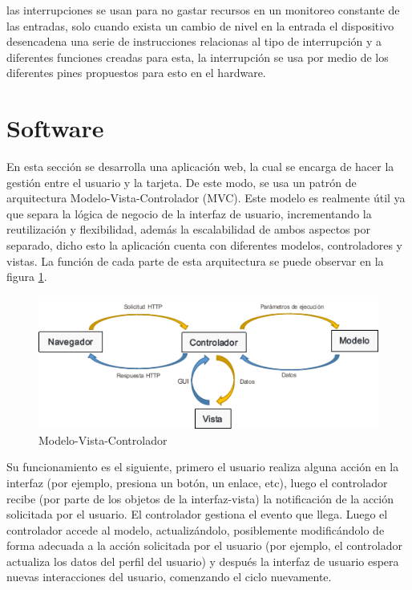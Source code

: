 las interrupciones se usan para no gastar recursos en un monitoreo constante de las entradas, solo cuando exista un cambio de nivel en la entrada el dispositivo desencadena una serie de instrucciones relacionas al tipo de interrupción y a diferentes funciones creadas para esta, la interrupción se usa por medio de los diferentes pines propuestos para esto en el hardware.

\section{Software}

En esta sección se desarrolla una aplicación web, la cual se encarga de hacer la gestión entre el usuario y la tarjeta. De este modo, se usa un patrón de arquitectura Modelo-Vista-Controlador (MVC). Este modelo es realmente útil ya que separa la lógica de negocio de la interfaz de usuario, incrementando la reutilización y flexibilidad, además la escalabilidad de ambos aspectos por separado, dicho esto la aplicación cuenta con diferentes modelos, controladores y vistas. La función de cada parte de esta arquitectura se puede observar en la figura \ref{fig:mvc}.\\


\begin{figure}[H]
	\centering
	\caption{Modelo-Vista-Controlador}
	\label{fig:mvc}
	\includegraphics[width=0.7\linewidth]{Imagenes/MVC}
\end{figure}


Su funcionamiento es el siguiente, primero el usuario realiza alguna acción en la interfaz (por ejemplo, presiona un botón, un enlace, etc), luego el controlador recibe (por parte de los objetos de la interfaz-vista) la notificación de la acción solicitada por el usuario. El controlador gestiona el evento que llega. Luego el controlador accede al modelo, actualizándolo, posiblemente modificándolo de forma adecuada a la acción solicitada por el usuario (por ejemplo, el controlador actualiza los datos del perfil del usuario) y después la interfaz de usuario espera nuevas interacciones del usuario, comenzando el ciclo nuevamente.\\

